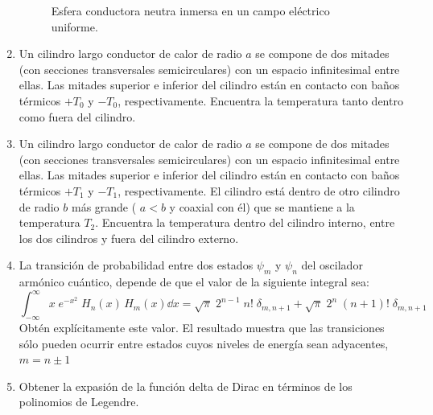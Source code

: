 \begin{enumerate}
\begin{figure}[!ht]
    \caption{Esfera conductora neutra inmersa en un campo eléctrico uniforme.}
    \label{fig:figura3}
\end{figure}
\item Un cilindro largo conductor de calor de radio $a$ se compone de dos mitades (con secciones transversales semicirculares) con un espacio infinitesimal entre ellas. Las mitades superior e inferior del cilindro están en contacto con baños térmicos $+T_{0}$ y $-T_{0}$, respectivamente. Encuentra la temperatura tanto dentro como fuera del cilindro.
\item Un cilindro largo conductor de calor de radio $a$ se compone de dos mitades (con secciones transversales semicirculares) con un espacio infinitesimal entre ellas. Las mitades superior e inferior del cilindro están en contacto con baños térmicos $+T_{1}$ y $-T_{1}$, respectivamente. El cilindro está dentro de otro cilindro de radio  $b$ más grande ( $a < b$ y coaxial con él) que se mantiene a la temperatura $T_{2}$. Encuentra la temperatura dentro del cilindro interno, entre los dos cilindros y fuera del cilindro externo.
\item La transición de probabilidad entre dos estados $\psi_{m}$ y $\psi_{n}$ del oscilador armónico cuántico, depende de que el valor de la siguiente integral sea:
\[ \int_{-\infty}^{\infty} x \; e^{-x^{2}} \; H_{n} (x) \, H_{m}(x) \dd x = \sqrt{\pi} \; 2^{n-1} \; n! \; \delta_{m,n+1} + \sqrt{\pi} \; 2^{n} \; (n+1)! \; \delta_{m,n+1} \]
Obtén explícitamente este valor. El resultado muestra que las transiciones sólo pueden ocurrir entre estados cuyos niveles de energía sean adyacentes, $m = n \pm 1$
% 
\item Obtener la expasión de la función delta de Dirac en términos de los polinomios de Legendre.

\end{enumerate}
